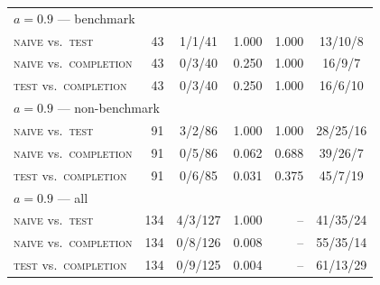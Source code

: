 \begin{table}[t]
\begin{tabular}{lrcrrc}
\midrule
\multicolumn{6}{l}{$a=0.9$ --- benchmark} \\
\addlinespace[1pt]
\quad \textsc{naive} vs.\ \textsc{test} & 43 & 1/1/41 & 1.000 & 1.000 & 13/10/8 \\
\quad \textsc{naive} vs.\ \textsc{completion} & 43 & 0/3/40 & 0.250 & 1.000 & 16/9/7 \\
\quad \textsc{test} vs.\ \textsc{completion} & 43 & 0/3/40 & 0.250 & 1.000 & 16/6/10 \\
\midrule
\multicolumn{6}{l}{$a=0.9$ --- non-benchmark} \\
\addlinespace[1pt]
\quad \textsc{naive} vs.\ \textsc{test} & 91 & 3/2/86 & 1.000 & 1.000 & 28/25/16 \\
\quad \textsc{naive} vs.\ \textsc{completion} & 91 & 0/5/86 & 0.062 & 0.688 & 39/26/7 \\
\quad \textsc{test} vs.\ \textsc{completion} & 91 & 0/6/85 & 0.031 & 0.375 & 45/7/19 \\
\midrule
\multicolumn{6}{l}{$a=0.9$ --- all} \\
\addlinespace[1pt]
\quad \textsc{naive} vs.\ \textsc{test} & 134 & 4/3/127 & 1.000 & -- & 41/35/24 \\
\quad \textsc{naive} vs.\ \textsc{completion} & 134 & 0/8/126 & 0.008 & -- & 55/35/14 \\
\quad \textsc{test} vs.\ \textsc{completion} & 134 & 0/9/125 & 0.004 & -- & 61/13/29 \\
\bottomrule
\end{tabular}
\end{table}
